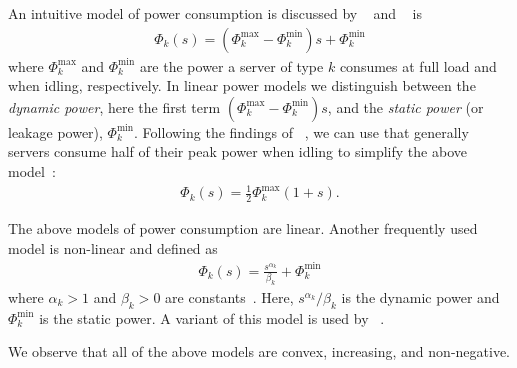 An intuitive model of power consumption is discussed by \citeauthor*{Dayarathna2016}~\cite{Dayarathna2016} and \citeauthor*{Ismail2020}~\cite{Ismail2020} is \begin{align}\label{eq:energy_model:1}
    \Phi_k(s) = (\Phi_k^{\text{max}} - \Phi_k^{\text{min}})s + \Phi_k^{\text{min}}
\end{align} where $\Phi_k^{\text{max}}$ and $\Phi_k^{\text{min}}$ are the power a server of type $k$ consumes at full load and when idling, respectively. In linear power models we distinguish between the \emph{dynamic power}, here the first term $(\Phi_k^{\text{max}} - \Phi_k^{\text{min}})s$, and the \emph{static power} (or leakage power), $\Phi_k^{\text{min}}$. Following the findings of \citeauthor*{Barroso2007}~\cite{Barroso2007}, we can use that generally servers consume half of their peak power when idling to simplify the above model~\cite{Ismail2020}: \begin{align}\label{eq:energy_model:2}
    \Phi_k(s) = \frac{1}{2} \Phi_k^{\text{max}} (1 + s).
\end{align}

The above models of power consumption are linear. Another frequently used model is non-linear and defined as \begin{align}\label{eq:energy_model:3}
    \Phi_k(s) = \frac{s^{\alpha_k}}{\beta_k} + \Phi_k^{\text{min}}
\end{align} where $\alpha_k > 1$ and $\beta_k > 0$ are constants~\cite{Dayarathna2016}. Here, $s^{\alpha_k}/\beta_k$ is the dynamic power and $\Phi_k^{\text{min}}$ is the static power. A variant of this model is used by \citeauthor*{Bansal2015}~\cite{Bansal2015}.

We observe that all of the above models are convex, increasing, and non-negative.

